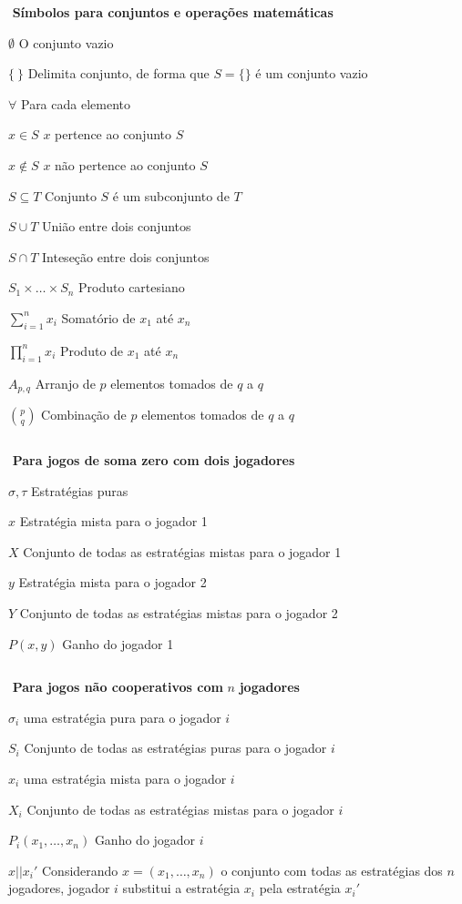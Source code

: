 \begin{simbolos}
	\item[$ $] \textbf{Símbolos para conjuntos e operações matemáticas}
	\item[$ \emptyset $] O conjunto vazio
	\item[$ \{\ \} $] Delimita conjunto, de forma que $S = \{\}$ é um conjunto vazio
	\item[$ \forall $] Para cada elemento
	\item[$ x\in S $] $x$ pertence ao conjunto $S$
	\item[$ x\notin S $] $x$ não pertence ao conjunto $S$
	\item[$ S\subseteq T $] Conjunto $S$ é um subconjunto de $T$
	\item[$ S\cup T $] União entre dois conjuntos
	\item[$ S\cap T $] Inteseção entre dois conjuntos
	\item[$ S_1\times\ldots\times S_n $] Produto cartesiano

	\item[$ \displaystyle\sum_{i=1}^{n} x_i $] Somatório de $x_1$ até $x_n$
	\item[$ \displaystyle\prod_{i=1}^{n} x_i $] Produto de $x_1$ até $x_n$
	\item[$ A_{p,q} $] Arranjo de $p$ elementos tomados de $q$ a $q$
	\item[$ \binom{p}{q} $] Combinação de $p$ elementos tomados de $q$ a $q$
	\item[$ $]

	\item[$ $] \textbf{Para jogos de soma zero com dois jogadores}
	\item[$ \sigma,\tau $] Estratégias puras
	\item[$ x $] Estratégia mista para o jogador 1
	\item[$ X $] Conjunto de todas as estratégias mistas para o jogador 1
	\item[$ y $] Estratégia mista para o jogador 2
	\item[$ Y $] Conjunto de todas as estratégias mistas para o jogador 2
	\item[$ P(x,y) $] Ganho do jogador 1
	\item[$ $]

	\item[$ $] \textbf{Para jogos não cooperativos com }$n$\textbf{ jogadores}
	\item[$ \sigma_i $] uma estratégia pura para o jogador $i$
	\item[$ S_i $] Conjunto de todas as estratégias puras para o jogador $i$
	\item[$ x_i $] uma estratégia mista para o jogador $i$
	\item[$ X_i $] Conjunto de todas as estratégias mistas para o jogador $i$
	\item[$ P_i(x_1,\ldots,x_n) $] Ganho do jogador $i$
	\item[$ x||x_{i}' $] Considerando $x = (x_1,\ldots,x_n)$ o conjunto com todas as estratégias dos $n$ jogadores, jogador $i$ substitui a estratégia $x_i$ pela estratégia $x_{i}'$

\end{simbolos}
